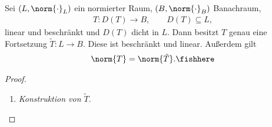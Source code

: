 \begin{prop}[Fortsetzungssatz]
\label{prop:2.23}
Sei $(L,\norm{\cdot}_L)$ ein normierter Raum, $(B,\norm{\cdot}_B)$ Banachraum,
\begin{align*}
T:D(T)\to B,\qquad D(T)\subseteq L,
\end{align*}
linear und beschränkt und $D(T)$ dicht in $L$. Dann besitzt $T$
genau eine Fortsetzung $\tilde{T} : L\to B$. Diese ist beschränkt und linear.
Außerdem gilt
\begin{align*}
\norm{T} = \norm{\tilde{T}}.\fishhere
\end{align*}
\end{prop}
\begin{proof}
\begin{enumerate}[label=\arabic{*}.)]
  \item \textit{Konstruktion von $\tilde{T}$}.


\end{enumerate}
\end{proof}
